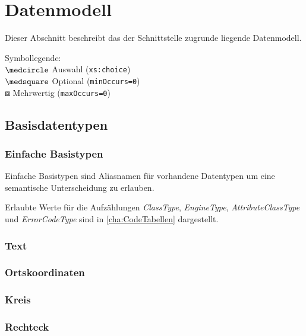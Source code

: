 \chapter{Datenmodell}
\label{cha:Datenmodell}
Dieser Abschnitt beschreibt das der Schnittstelle zugrunde liegende Datenmodell. \medskip

\noindent Symbollegende:\\
$\medcircle$ Auswahl (\verb|xs:choice|)\\
$\medsquare$ Optional (\verb|minOccurs=0|)\\
$\boxbox$ Mehrwertig (\verb|maxOccurs=0|)\\


\section{Basisdatentypen}
\label{sec:Datenmodell:Basisdatentypen}

\subsection*{Einfache Basistypen}
Einfache Basistypen sind Aliasnamen für vorhandene Datentypen um eine semantische Unterscheidung zu erlauben.


Erlaubte Werte für die Aufzählungen \emph{ClassType}, \emph{EngineType}, \emph{AttributeClassType} und \emph{ErrorCodeType} sind in \autoref{cha:CodeTabellen} dargestellt.

\subsection*{Text}



\subsection*{Ortskoordinaten}



\subsection*{Kreis}



\subsection*{Rechteck}



